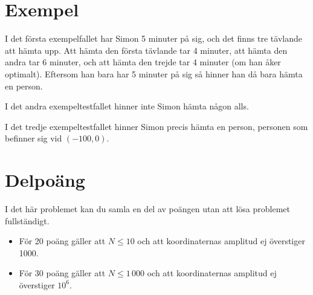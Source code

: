 \section*{Exempel}
I det första exempelfallet har Simon 5 minuter på sig, och det finns tre tävlande att hämta upp. Att hämta den första tävlande tar 4 minuter, att hämta den andra tar 6 minuter, och att hämta den trejde tar 4 minuter (om han åker optimalt). Eftersom han bara har 5 minuter på sig så hinner han då bara hämta en person.

I det andra exempeltestfallet hinner inte Simon hämta någon alls.

I det tredje exempeltestfallet hinner Simon precis hämta en person, personen som befinner sig vid $(-100, 0)$.

\section*{Delpoäng}
I det här problemet kan du samla en del av poängen utan att lösa problemet fullständigt.

\begin{itemize}
    \item För 20 poäng gäller att $N \leq 10$ och att koordinaternas amplitud ej överstiger 1000.
    \item För 30 poäng gäller att $N \leq 1\,000$ och att koordinaternas amplitud ej överstiger $10^6$.
\end{itemize}
